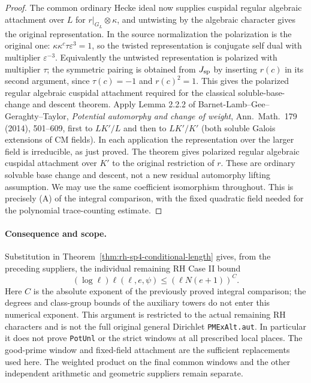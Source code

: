 \begin{proof}
The common ordinary Hecke ideal now supplies
cuspidal regular algebraic attachment over $L$
for $r|_{G_L}\otimes\kappa$, and untwisting
by the algebraic character gives the original
representation. In the source normalization
the polarization is the original one:
$\kappa\kappa^c\tau\varepsilon^3=1$,
so the twisted representation is
conjugate self dual with multiplier
$\varepsilon^{-3}$. Equivalently the
untwisted representation is polarized
with multiplier $\tau$; the symmetric
pairing is obtained from $J_{\rm sp}$ by
inserting $r(c)$ in its second argument,
since $\tau(c)=-1$ and $r(c)^2=1$.
This gives the polarized regular
algebraic cuspidal attachment required
for the classical soluble-base-change
and descent theorem. Apply Lemma 2.2.2
of Barnet-Lamb--Gee--Geraghty--Taylor,
\emph{Potential automorphy and change of weight},
Ann.\ Math.\ 179 (2014), 501--609, first to
$LK'/L$ and then to $LK'/K'$ (both soluble
Galois extensions of CM fields).
In each application the representation
over the larger field is irreducible,
as just proved. The theorem gives
polarized regular algebraic cuspidal
attachment over $K'$ to the original
restriction of $r$. These are ordinary
solvable base change and descent, not
a new residual automorphy lifting
assumption. We may use the same coefficient
isomorphism throughout. This is precisely
(A) of the integral comparison, with the
fixed quadratic field needed for the
polynomial trace-counting estimate.
\end{proof}

\paragraph{Consequence and scope.}
Substitution in Theorem~\ref{thm:rh-sp4-conditional-length}
gives, from the preceding suppliers, the individual remaining
RH Case II bound
\[
    (\log\ell)\ell(\ell,e,\psi)
                    \le (\ell N(e+1))^C .
\]
Here $C$ is the absolute exponent of the previously proved
integral comparison; the degrees and class-group bounds of
the auxiliary towers do not enter this numerical exponent.
This argument is restricted to the actual remaining RH
characters and is not the full original general Dirichlet
\texttt{PMExAlt.aut}. In particular it does not prove
\texttt{PotUnl} or the strict windows at all prescribed local
places. The good-prime window and fixed-field attachment
are the sufficient replacements used here. The weighted
product on the final common windows and the other independent
arithmetic and geometric suppliers remain separate.
